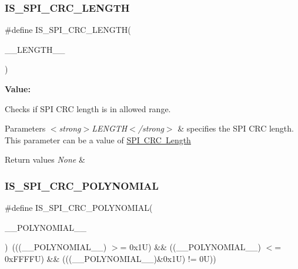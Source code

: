 \subsubsection{\texorpdfstring{IS\_SPI\_CRC\_LENGTH}{IS\_SPI\_CRC\_LENGTH}}
{\footnotesize\ttfamily \#define I\+S\+\_\+\+S\+P\+I\+\_\+\+C\+R\+C\+\_\+\+L\+E\+N\+G\+TH(\begin{DoxyParamCaption}\item[{}]{\+\_\+\+\_\+\+L\+E\+N\+G\+T\+H\+\_\+\+\_\+ }\end{DoxyParamCaption})}

{\bfseries Value\+:}
\begin{DoxyCode}{0}

\end{DoxyCode}


Checks if S\+PI C\+RC length is in allowed range. 


\begin{DoxyParams}{Parameters}
{\em $<$strong$>$\+L\+E\+N\+G\+T\+H$<$/strong$>$} & specifies the S\+PI C\+RC length. This parameter can be a value of \mbox{\hyperlink{group___s_p_i___c_r_c__length}{S\+PI C\+RC Length}} \\
\hline
\end{DoxyParams}

\begin{DoxyRetVals}{Return values}
{\em None} & \\
\hline
\end{DoxyRetVals}
\mbox{\label{group___s_p_i___private___macros_ga1b4b6bb5771cb0070af660d169d4ef09}} 
\subsubsection{\texorpdfstring{IS\_SPI\_CRC\_POLYNOMIAL}{IS\_SPI\_CRC\_POLYNOMIAL}}
{\footnotesize\ttfamily \#define I\+S\+\_\+\+S\+P\+I\+\_\+\+C\+R\+C\+\_\+\+P\+O\+L\+Y\+N\+O\+M\+I\+AL(\begin{DoxyParamCaption}\item[{}]{\+\_\+\+\_\+\+P\+O\+L\+Y\+N\+O\+M\+I\+A\+L\+\_\+\+\_\+ }\end{DoxyParamCaption})~(((\+\_\+\+\_\+\+P\+O\+L\+Y\+N\+O\+M\+I\+A\+L\+\_\+\+\_\+) $>$= 0x1\+U) \&\& ((\+\_\+\+\_\+\+P\+O\+L\+Y\+N\+O\+M\+I\+A\+L\+\_\+\+\_\+) $<$= 0x\+F\+F\+F\+F\+U) \&\& (((\+\_\+\+\_\+\+P\+O\+L\+Y\+N\+O\+M\+I\+A\+L\+\_\+\+\_\+)\&0x1\+U) != 0\+U))}



